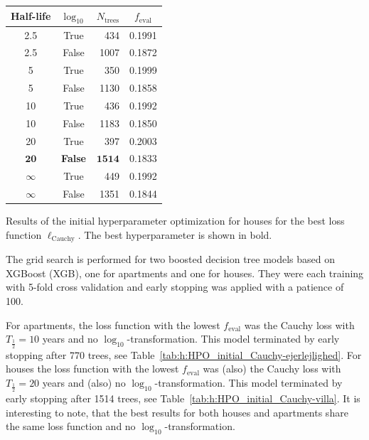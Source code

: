 \begin{margintable}[0.5cm]
  \begin{tabular}{@{}ccrc@{}}
    Half-life & $\log_{10}$ & $N_\mathrm{trees}$ & $f_\mathrm{eval}$ \\
    \midrule
    \num{2.5} & True & \num{434} & \num{0.1991} \\
    \num{2.5} & False & \num{1007} & \num{0.1872} \\
    \num{5} & True & \num{350} & \num{0.1999} \\
    \num{5} & False & \num{1130} & \num{0.1858} \\
    \num{10} & True & \num{436} & \num{0.1992} \\
    \num{10} & False & \num{1183} & \num{0.1850} \\
    \num{20} & True & \num{397} & \num{0.2003} \\
    $\mathbf{20}$ & \textbf{False} & $\mathbf{1514}$ & $\mathbf{0.1833}$ \\
    $\infty$ & True & \num{449} & \num{0.1992} \\
    $\infty$ & False & \num{1351} & \num{0.1844} \\
  \end{tabular}
  \vspace{1.5mm}
  \caption[Results from the Initial Hyperparameter Optimization for Houses]{\label{tab:h:HPO_initial_Cauchy-villa}Results of the initial hyperparameter optimization for houses for the best loss function $\ell_\mathrm{Cauchy}$. The best hyperparameter is shown in bold.}
\end{margintable}


The grid search is performed for two boosted decision tree models based on XGBoost \autocite{chenXGBoostScalableTree2016} (XGB), one for apartments and one for houses. They were each training with \num{5}-fold cross validation and early stopping was applied with a patience of \num{100}. 

For apartments, the loss function with the lowest $f_\mathrm{eval}$ was the Cauchy loss with $T_{\frac{1}{2}}=10$ years and no $\log_{10}$-transformation. This model terminated by early stopping after \num{770} trees, see Table~\ref{tab:h:HPO_initial_Cauchy-ejerlejlighed}. 
For houses the loss function with the lowest $f_\mathrm{eval}$ was (also) the Cauchy loss with $T_{\frac{1}{2}}=20$ years and (also) no $\log_{10}$-transformation. This model terminated by early stopping after \num{1514} trees, see Table~\ref{tab:h:HPO_initial_Cauchy-villa}. 
It is interesting to note, that the best results for both houses and apartments share the same loss function and no $\log_{10}$-transformation. 

